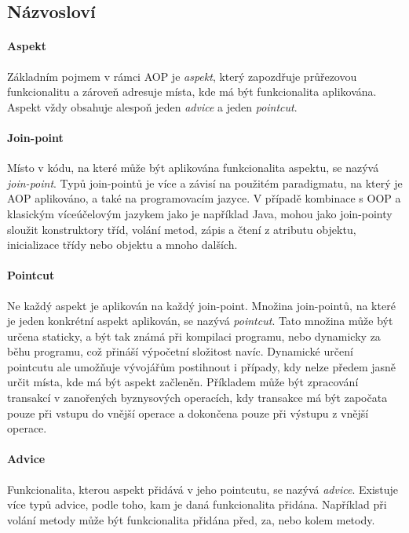 \subsection{Názvosloví}

\paragraph{Aspekt}
Základním pojmem v rámci \gls{AOP} je \textit{aspekt},
který zapozdřuje průřezovou funkcionalitu a zároveň adresuje místa, kde má být
funkcionalita aplikována. Aspekt vždy obsahuje alespoň jeden \textit{advice}
a jeden \textit{pointcut}.

\paragraph{Join-point}
Místo v kódu, na které může být aplikována funkcionalita aspektu, se nazývá
\textit{join-point}. Typů join-pointů je více a závisí na použitém paradigmatu,
na který je \gls{AOP} aplikováno, a také na programovacím jazyce. V případě
kombinace s \gls{OOP} a klasickým víceúčelovým jazykem jako je například Java,
mohou jako join-pointy sloužit konstruktory tříd, volání metod, zápis a čtení
z atributu objektu, inicializace třídy nebo objektu a mnoho dalších.

\paragraph{Pointcut}
Ne každý aspekt je aplikován na každý join-point. Množina join-pointů,
na které je jeden konkrétní aspekt aplikován, se nazývá \textit{pointcut}.
Tato množina může být určena staticky, a být tak známá při kompilaci programu, nebo
dynamicky za běhu programu, což přináší výpočetní složitost navíc.
Dynamické určení pointcutu ale umožňuje vývojářům postihnout i případy,
kdy nelze předem jasně určit místa, kde má být aspekt začleněn.
Příkladem může být zpracování transakcí v zanořených byznysových operacích,
kdy transakce má být započata pouze při vstupu do vnější operace
a dokončena pouze při výstupu z vnější operace.

\paragraph{Advice}
Funkcionalita, kterou aspekt přidává v jeho pointcutu, se nazývá
\textit{advice}. Existuje více typů advice, podle toho, kam je
daná funkcionalita přidána. Například při volání metody může
být funkcionalita přidána před, za, nebo kolem metody.

